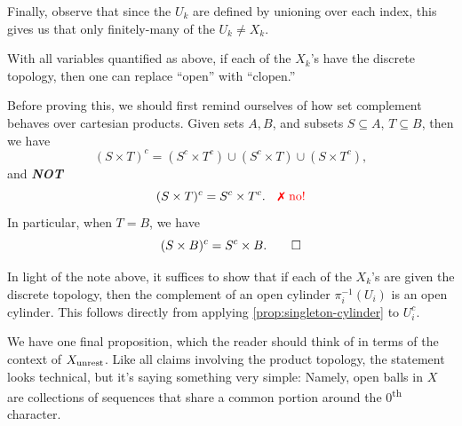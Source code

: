 \documentclass{fkpaper}
\begin{document}
\begin{multicols}{2}
\begin{sproof}
    Finally, observe that since the $U_k$ are defined by unioning over
    each index, this gives us that only finitely-many of the $U_k \neq
    X_k$. \qedhere
  \end{sproof}
  \begin{proposition}\label{prop:clopen-discrete}
    With all variables quantified as above, if each of the $X_k$'s have
    the discrete topology, then one can replace ``open'' with
    ``clopen.''
  \end{proposition}
  Before proving this, we should first remind ourselves of how set
  complement behaves over cartesian products. Given sets $A,B$, and
  subsets $S \subseteq A$, $T \subseteq B$, then we have
  \[
    (S \times T)^c = (S^c \times T^c) \cup (S^c \times T) \cup (S
    \times T^c),
  \]
  and \textbf{\emph{NOT}}
  \[
    (S \times T)^c = S^c \times T^c. \quad {\color{red} \xmark \text{
        no!}}
  \]
  In particular, when $T = B$, we have
  \[
    (S \times B)^c = S^c \times B. \qedhere
  \]
  \begin{sproof}
    In light of the note above, it suffices to show that if each of the
    $X_k$'s are given the discrete topology, then the complement of an
    open cylinder $\pi_i^{-1}(U_i)$ is an open cylinder. This follows
    directly from applying \cref{prop:singleton-cylinder} to $U_i^c$.
  \end{sproof}
  We have one final proposition, which the reader should think of in
  terms of the context of $X_{\rm unrest}$. Like all claims involving
  the product topology, the statement looks technical, but it's saying
  something very simple: Namely, open balls in $X$ are collections of
  sequences that share a common portion around the
  $0$\textsuperscript{th} character.


\end{multicols}
\end{document}
